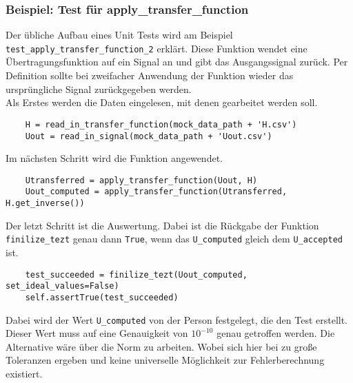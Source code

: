 \documentclass[../Report.tex]{subfiles}
\begin{document}
\subsubsection{Beispiel: Test für apply\_transfer\_function}
\label{subsubsec.code.tdd.example}
Der übliche Aufbau eines Unit Tests wird am Beispiel \lstinline{test_apply_transfer_function_2} erklärt. Diese Funktion wendet eine Übertragungsfunktion auf ein Signal an und gibt das Ausgangssignal zurück. Per Definition sollte bei zweifacher Anwendung der Funktion wieder das ursprüngliche Signal zurückgegeben werden.\\
Als Erstes werden die Daten eingelesen, mit denen gearbeitet werden soll.
\lstset{language=Python}
\begin{lstlisting}
	H = read_in_transfer_function(mock_data_path + 'H.csv')
	Uout = read_in_signal(mock_data_path + 'Uout.csv')	
\end{lstlisting}
Im nächsten Schritt wird die Funktion angewendet.
\lstset{language=Python}
\begin{lstlisting}
	Utransferred = apply_transfer_function(Uout, H)
	Uout_computed = apply_transfer_function(Utransferred, H.get_inverse())	
\end{lstlisting}
Der letzt Schritt ist die Auswertung. Dabei ist die Rückgabe der Funktion \lstinline{finilize_tezt} genau dann \lstinline{True}, wenn das \lstinline{U_computed} gleich dem \lstinline{U_accepted} ist.
\lstset{language=Python}
\begin{lstlisting}
	test_succeeded = finilize_tezt(Uout_computed, set_ideal_values=False)
	self.assertTrue(test_succeeded)
\end{lstlisting}
Dabei wird der Wert \lstinline{U_computed} von der Person festgelegt, die den Test erstellt. Dieser Wert muss auf eine Genauigkeit von $10^{-10}$ genau getroffen werden. Die Alternative wäre über die Norm zu arbeiten. Wobei sich hier bei zu große Toleranzen ergeben und keine universelle Möglichkeit zur Fehlerberechnung existiert.
\end{document}
